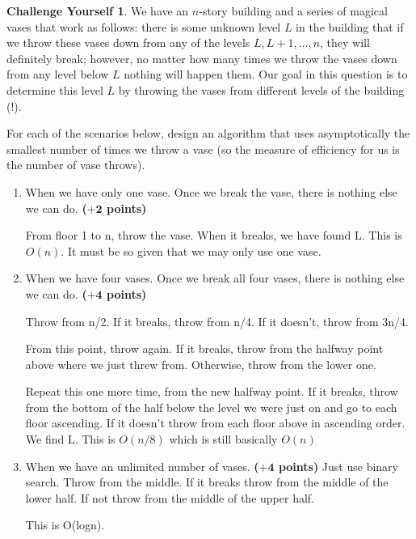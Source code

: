 \documentclass{article}
\theoremstyle{definition}
\newtheorem*{challenge}{Challenge Yourself}
\newcommand{\grade}[1]{\hfill{\textbf{($\mathbf{#1}$ points)}}}
\begin{document}
  \begin{challenge}
    We have an $n$-story building and a series of magical vases that work as follows: there is some unknown level $L$ in the building that if we throw these vases down from any of the levels $L,L+1,\ldots,n$, they will definitely break; however,
    no matter how many times we throw the vases down from any level below $L$ nothing will happen them. Our goal in this question is to determine this level $L$ by throwing the vases from different levels of the building (!).

    For each of the scenarios below, design an algorithm that uses asymptotically the smallest number of times we throw a vase (so the measure of efficiency for us is the number of vase throws).
    \begin{enumerate}
      \item[(a)] When we have only one vase. Once we break the vase, there is nothing else we can do. \grade{+2}

        From floor 1 to n, throw the vase. When it breaks, we have found L.
        This is $O(n)$. It must be so given that we may only use one vase.

      \item[(b)] When we have  four vases. Once we break all four vases, there is nothing else we can do. \grade{+4}

        Throw from n/2. If it breaks, throw from n/4. If it doesn't, throw from 3n/4.

        From this point, throw again. If it breaks, throw from the halfway point above where we just threw from. Otherwise, throw from the lower one.

        Repeat this one more time, from the new halfway point. If it breaks, throw from the bottom of the half below the level we were just on and go to each floor ascending. If it doesn't throw from each floor above in ascending order. We find L. This is $O(n/8)$ which is still basically $O(n)$
      \item[(c)] When we have an unlimited number of vases.  \grade{+4}
        Just use binary search. Throw from the middle. If it breaks throw from the middle of the lower half. If not throw from the middle of the upper half.

        This is O(logn).
    \end{enumerate}
  \end{challenge}

  
\end{document}
